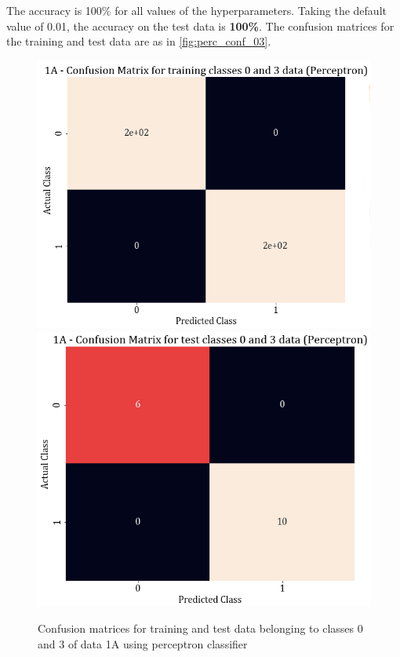 \documentclass[11pt,a4paper]{article}
\begin{document}
The accuracy is 100\% for all values of the hyperparameters. Taking the default value of 0.01, the accuracy on the test data is \textbf{100\%}. The confusion matrices for the training and test data are as in \autoref{fig:perc_conf_03}.
\begin{figure}[H]
    \centering
    \includegraphics[scale=0.3]{images/1A_perceptron_training_classes_0_and_3_confmat.png}
    \includegraphics[scale=0.3]{images/1A_perceptron_test_classes_0_and_3_confmat.png}
    \caption{Confusion matrices for training and test data belonging to classes 0 and 3 of data 1A using perceptron classifier}
    \label{fig:perc_conf_03}
\end{figure}
\end{document}
